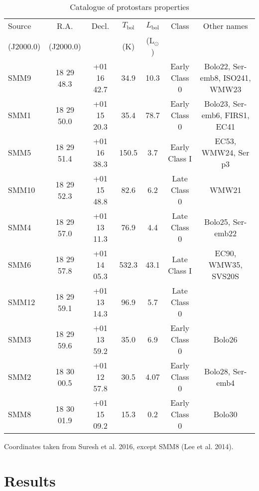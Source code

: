 \documentclass{aa}
\begin{document}
\begin{table*}
\caption{Catalogue of protostars properties}             %
\label{table:2}      %
\centering                          %
\begin{tabular}{l c c c c c c} 
\hline\hline 
Source & R.A. & Decl. & $T_\mathrm{bol}$ &  $L_\mathrm{bol}$  & Class & Other names\\
 (J2000.0) & (J2000.0) & & (K) & (L$_\odot$) & &\\
\hline  

SMM9 & 18 29 48.3 & +01 16 42.7 &  34.9 & 10.3 & Early Class 0 & Bolo22, Ser-emb8, ISO241, WMW23\\

SMM1 & 18 29 50.0 & +01 15 20.3 & 35.4 & 78.7 & Early Class 0 & Bolo23, Ser-emb6, FIRS1, EC41\\

SMM5 & 18 29 51.4 & +01 16 38.3 & 150.5 & 3.7 & Early Class I & EC53, WMW24, Ser p3 \\

SMM10 & 18 29 52.3 & +01 15 48.8 & 82.6 & 6.2 & Late Class 0 & WMW21\\

SMM4 & 18 29 57.0 & +01 13 11.3 & 76.9 & 4.4 & Late Class 0 & Bolo25, Ser-emb22\\

SMM6 & 18 29 57.8 & +01 14 05.3 & 532.3 & 43.1 & Late Class I & EC90, WMW35, SVS20S \\

SMM12 & 18 29 59.1 & +01 13 14.3 & 96.9 & 5.7 & Late Class 0 &\\

SMM3 & 18 29 59.6 & +01 13 59.2 & 35.0 & 6.9 & Early Class 0 & Bolo26\\

SMM2 & 18 30 00.5 & +01 12 57.8 & 30.5 & 4.07 & Early Class 0 & Bolo28, Ser-emb4\\

SMM8 & 18 30 01.9 & +01 15 09.2 & 15.3 & 0.2 & Early Class 0 & Bolo30\\
\hline
\end{tabular}
\begin{flushleft}
Coordinates taken from Suresh et al. 2016, except SMM8 (Lee et al. 2014).\\
\end{flushleft}
\end{table*}

\section{Results}
\end{document}

